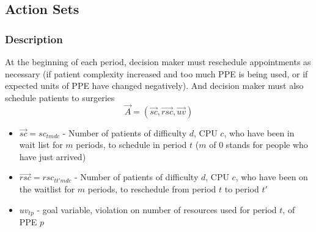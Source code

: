 \documentclass{article}
\begin{document}
\subsection{Action Sets}

\subsubsection{Description}
At the beginning of each period, decision maker must reschedule appointments as necessary (if patient complexity increased and too much PPE is being used, or if expected units of PPE have changed negatively). And decision maker must also schedule patients to surgeries
\[  \vec{A} = (\vec{sc}, \vec{rsc}, \vec{uv}) \] 
\begin{itemize}
    \item $\vec{sc} = sc_{tmdc}$ - Number of patients of difficulty $d$, CPU $c$, who have been in wait list for $m$ periods, to schedule in period $t$ ($m$ of 0 stands for people who have just arrived)
	\item $\vec{rsc} = rsc_{tt'mdc}$ - Number of patients of difficulty $d$, CPU $c$, who have been on the waitlist for $m$ periods, to reschedule from period $t$ to period $t'$
	\item $uv_{tp}$ - goal variable, violation on number of resources used for period $t$, of PPE $p$
\end{itemize}
\end{document}
